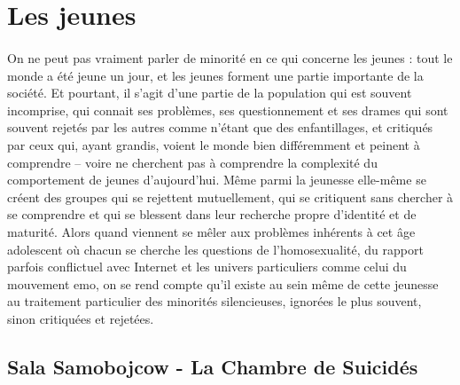 \documentclass[12pt]{amsart}
\begin{document}
\clearpage
\section{Les jeunes}
\paragraph{}
On ne peut pas vraiment parler de minorité en ce qui concerne les jeunes : tout le monde a été jeune un jour, et les jeunes forment une partie importante de la société. Et pourtant, il s’agit d’une partie de la population qui est souvent incomprise, qui connait ses problèmes, ses questionnement et ses drames qui sont souvent rejetés par les autres comme n’étant que des enfantillages, et critiqués par ceux qui, ayant grandis, voient le monde bien différemment et peinent à comprendre – voire ne cherchent pas à comprendre la complexité du comportement de jeunes d’aujourd’hui. Même parmi la jeunesse elle-même se créent des groupes qui se rejettent mutuellement, qui se critiquent sans chercher à se comprendre et qui se blessent dans leur recherche propre d’identité et de maturité. Alors quand viennent se mêler aux problèmes inhérents à cet âge adolescent où chacun se cherche les questions de l’homosexualité, du rapport parfois conflictuel avec Internet et les univers particuliers comme celui du mouvement emo, on se rend compte qu’il existe au sein même de cette jeunesse au traitement particulier des minorités silencieuses, ignorées le plus souvent, sinon critiquées et rejetées.

\subsection*{Sala Samobojcow - La Chambre de Suicidés}
\end{document}
